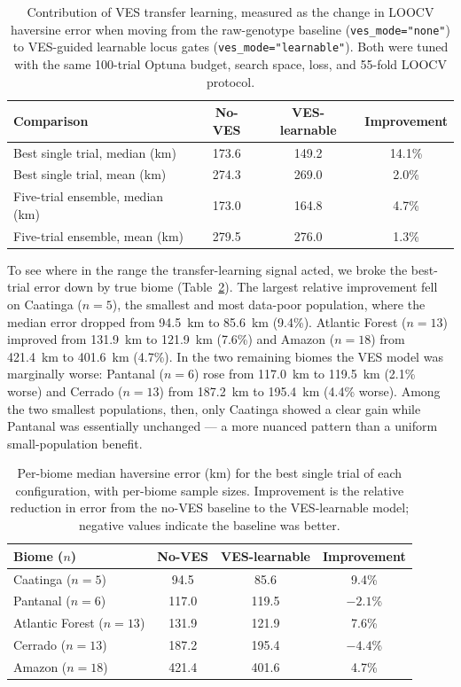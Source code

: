 \documentclass[twocolumn,10pt]{article}
\begin{document}
\begin{table}[t]
\centering
\caption{Contribution of VES transfer learning, measured as the change in LOOCV haversine error when
moving from the raw-genotype baseline (\texttt{ves\_mode="none"}) to VES-guided learnable locus
gates (\texttt{ves\_mode="learnable"}). Both were tuned with the same 100-trial Optuna budget,
search space, loss, and 55-fold LOOCV protocol.}
\begin{tabular}{lccc}
\toprule
Comparison & No-VES & VES-learnable & Improvement \\
\midrule
Best single trial, median (km) & 173.6 & 149.2 & 14.1\% \\
Best single trial, mean (km)   & 274.3 & 269.0 & 2.0\% \\
Five-trial ensemble, median (km) & 173.0 & 164.8 & 4.7\% \\
Five-trial ensemble, mean (km)   & 279.5 & 276.0 & 1.3\% \\
\bottomrule
\end{tabular}
\label{tab:ves-contribution}
\end{table}

To see where in the range the transfer-learning signal acted, we broke the best-trial error down by
true biome (Table~\ref{tab:ves-perbiome}). The largest relative improvement fell on Caatinga
($n=5$), the smallest and most data-poor population, where the median error dropped from 94.5~km to
85.6~km (9.4\%). Atlantic Forest ($n=13$) improved from 131.9~km to 121.9~km (7.6\%) and Amazon
($n=18$) from 421.4~km to 401.6~km (4.7\%). In the two remaining biomes the VES model was marginally
worse: Pantanal ($n=6$) rose from 117.0~km to 119.5~km (2.1\% worse) and Cerrado ($n=13$) from
187.2~km to 195.4~km (4.4\% worse). Among the two smallest populations, then, only Caatinga showed a
clear gain while Pantanal was essentially unchanged --- a more nuanced pattern than a uniform
small-population benefit.

\begin{table}[t]
\centering
\caption{Per-biome median haversine error (km) for the best single trial of each configuration, with
per-biome sample sizes. Improvement is the relative reduction in error from the no-VES baseline to
the VES-learnable model; negative values indicate the baseline was better.}
\begin{tabular}{lccc}
\toprule
Biome ($n$) & No-VES & VES-learnable & Improvement \\
\midrule
Caatinga ($n=5$)        & 94.5  & 85.6  & 9.4\% \\
Pantanal ($n=6$)        & 117.0 & 119.5 & $-2.1$\% \\
Atlantic Forest ($n=13$)& 131.9 & 121.9 & 7.6\% \\
Cerrado ($n=13$)        & 187.2 & 195.4 & $-4.4$\% \\
Amazon ($n=18$)         & 421.4 & 401.6 & 4.7\% \\
\bottomrule
\end{tabular}
\label{tab:ves-perbiome}
\end{table}
\end{document}
